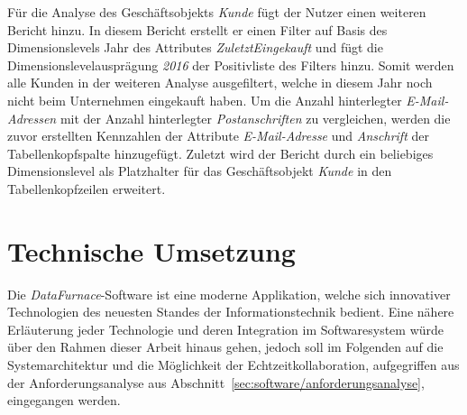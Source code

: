 \documentclass[
  language=german, %
  type=bachelor,%
  ngerman
]{isthesis}
\begin{document}
\begin{content}
  Für die Analyse des Geschäftsobjekts \textit{Kunde} fügt der Nutzer einen
  weiteren Bericht hinzu. In diesem Bericht erstellt er einen Filter auf Basis
  des Dimensionslevels Jahr des Attributes \textit{ZuletztEingekauft} und fügt
  die Dimensionslevelausprägung \textit{2016} der Positivliste des Filters
  hinzu. Somit werden alle Kunden in der weiteren Analyse ausgefiltert, welche
  in diesem Jahr noch nicht beim Unternehmen eingekauft haben. Um die Anzahl
  hinterlegter \textit{E-Mail-Adressen} mit der Anzahl hinterlegter
  \textit{Postanschriften} zu vergleichen, werden die zuvor erstellten
  Kennzahlen der Attribute \textit{E-Mail-Adresse} und \textit{Anschrift} der
  Tabellenkopfspalte hinzugefügt. Zuletzt wird der Bericht durch ein beliebiges
  Dimensionslevel als Platzhalter für das Geschäftsobjekt \textit{Kunde} in den
  Tabellenkopfzeilen erweitert.


  \section{Technische Umsetzung}\label{sec:technische-umsetzung}


  Die \textit{DataFurnace}-Software ist eine moderne Applikation, welche sich
  innovativer Technologien des neuesten Standes der Informationstechnik
  bedient. Eine nähere Erläuterung jeder Technologie und deren Integration im
  Softwaresystem würde über den Rahmen dieser Arbeit hinaus gehen, jedoch soll
  im Folgenden auf die Systemarchitektur und die Möglichkeit der
  Echtzeitkollaboration, aufgegriffen aus der Anforderungsanalyse aus
  Abschnitt~\ref{sec:software/anforderungsanalyse}, eingegangen werden.


\end{content}
\end{document}
